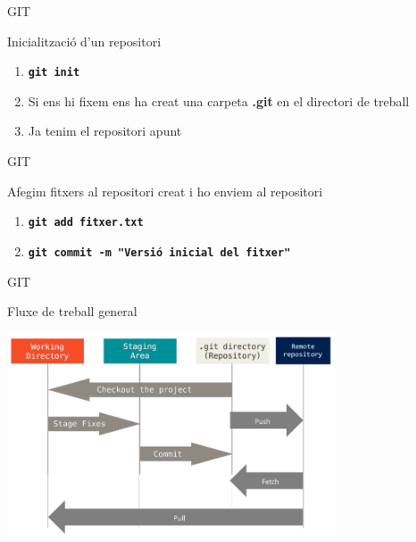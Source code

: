\documentclass[10pt,xcolor={rgb}]{beamer}
\begin{document}
    \begin{frame}[fragile]{GIT}
      \begin{block}{Inicialització d'un repositori}

        \begin{enumerate}
          \item \texttt{\textbf{git init}}
          \item Si ens hi fixem ens ha creat una carpeta \textbf{.git} en el directori de treball
          \item Ja tenim el repositori apunt

        \end{enumerate}

      \end{block}
    \end{frame}

    \begin{frame}[fragile]{GIT}
      \begin{block}{Afegim fitxers al repositori creat i ho enviem al repositori}

        \begin{enumerate}
          \item \texttt{\textbf{git add fitxer.txt}}
          \item \texttt{\textbf{git commit -m "Versió inicial del fitxer"}}
        \end{enumerate}

      \end{block}
    \end{frame}

    \begin{frame}[fragile]{GIT}
      \begin{block}{Fluxe de treball general}

        \centering
        \includegraphics[height=6cm]{git.png}

      \end{block}
    \end{frame}
\end{document}
